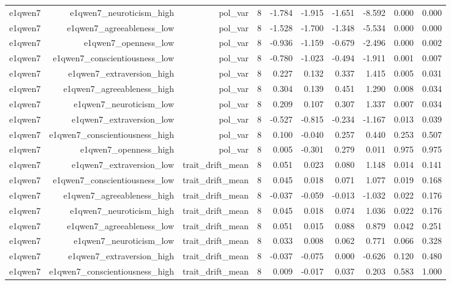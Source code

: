 \documentclass[11pt]{article}
\begin{document}
\begin{landscape}
\begin{longtable}{@{}lrrrrrrrrr@{}}
e1qwen7 & e1qwen7\_neuroticism\_high & pol\_var & 8 & -1.784 & -1.915 & -1.651 & -8.592 & 0.000 & 0.000 \\
e1qwen7 & e1qwen7\_agreeableness\_low & pol\_var & 8 & -1.528 & -1.700 & -1.348 & -5.534 & 0.000 & 0.000 \\
e1qwen7 & e1qwen7\_openness\_low & pol\_var & 8 & -0.936 & -1.159 & -0.679 & -2.496 & 0.000 & 0.002 \\
e1qwen7 & e1qwen7\_conscientiousness\_low & pol\_var & 8 & -0.780 & -1.023 & -0.494 & -1.911 & 0.001 & 0.007 \\
e1qwen7 & e1qwen7\_extraversion\_high & pol\_var & 8 & 0.227 & 0.132 & 0.337 & 1.415 & 0.005 & 0.031 \\
e1qwen7 & e1qwen7\_agreeableness\_high & pol\_var & 8 & 0.304 & 0.139 & 0.451 & 1.290 & 0.008 & 0.034 \\
e1qwen7 & e1qwen7\_neuroticism\_low & pol\_var & 8 & 0.209 & 0.107 & 0.307 & 1.337 & 0.007 & 0.034 \\
e1qwen7 & e1qwen7\_extraversion\_low & pol\_var & 8 & -0.527 & -0.815 & -0.234 & -1.167 & 0.013 & 0.039 \\
e1qwen7 & e1qwen7\_conscientiousness\_high & pol\_var & 8 & 0.100 & -0.040 & 0.257 & 0.440 & 0.253 & 0.507 \\
e1qwen7 & e1qwen7\_openness\_high & pol\_var & 8 & 0.005 & -0.301 & 0.279 & 0.011 & 0.975 & 0.975 \\
e1qwen7 & e1qwen7\_extraversion\_low & trait\_drift\_mean & 8 & 0.051 & 0.023 & 0.080 & 1.148 & 0.014 & 0.141 \\
e1qwen7 & e1qwen7\_conscientiousness\_low & trait\_drift\_mean & 8 & 0.045 & 0.018 & 0.071 & 1.077 & 0.019 & 0.168 \\
e1qwen7 & e1qwen7\_agreeableness\_high & trait\_drift\_mean & 8 & -0.037 & -0.059 & -0.013 & -1.032 & 0.022 & 0.176 \\
e1qwen7 & e1qwen7\_neuroticism\_high & trait\_drift\_mean & 8 & 0.045 & 0.018 & 0.074 & 1.036 & 0.022 & 0.176 \\
e1qwen7 & e1qwen7\_agreeableness\_low & trait\_drift\_mean & 8 & 0.051 & 0.015 & 0.088 & 0.879 & 0.042 & 0.251 \\
e1qwen7 & e1qwen7\_neuroticism\_low & trait\_drift\_mean & 8 & 0.033 & 0.008 & 0.062 & 0.771 & 0.066 & 0.328 \\
e1qwen7 & e1qwen7\_extraversion\_high & trait\_drift\_mean & 8 & -0.037 & -0.075 & 0.000 & -0.626 & 0.120 & 0.480 \\
e1qwen7 & e1qwen7\_conscientiousness\_high & trait\_drift\_mean & 8 & 0.009 & -0.017 & 0.037 & 0.203 & 0.583 & 1.000 \\

\end{longtable}
\end{landscape}
\end{document}
